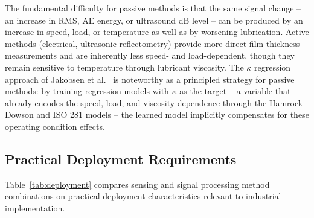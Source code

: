 The fundamental difficulty for passive methods is that the same signal change -- an increase in RMS, AE energy, or ultrasound dB level -- can be produced by an increase in speed, load, or temperature as well as by worsening lubrication. Active methods (electrical, ultrasonic reflectometry) provide more direct film thickness measurements and are inherently less speed- and load-dependent, though they remain sensitive to temperature through lubricant viscosity. The $\kappa$ regression approach of Jakobsen et al.\ \cite{jakobsen_detecting_2023} is noteworthy as a principled strategy for passive methods: by training regression models with $\kappa$ as the target -- a variable that already encodes the speed, load, and viscosity dependence through the Hamrock--Dowson and ISO 281 models -- the learned model implicitly compensates for these operating condition effects.

\subsection{Practical Deployment Requirements}
\label{subsec:comp_deployment}

Table~\ref{tab:deployment} compares sensing and signal processing method combinations on practical deployment characteristics relevant to industrial implementation.

